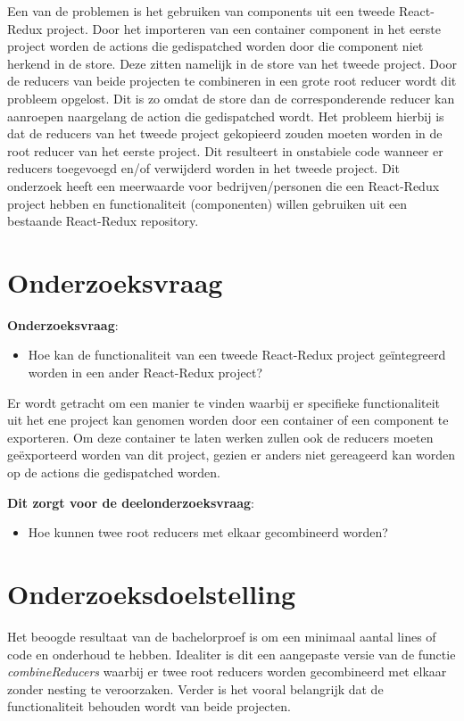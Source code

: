 Een van de problemen is het gebruiken van components uit een tweede React-Redux project. Door het importeren van een container component in het eerste project worden de actions die gedispatched worden door die component niet herkend in de store. Deze zitten namelijk in de store van het tweede project. Door de reducers van beide projecten te combineren in een grote root reducer wordt dit probleem opgelost. Dit is zo omdat de store dan de corresponderende reducer kan aanroepen naargelang de action die gedispatched wordt. Het probleem hierbij is dat de reducers van het tweede project gekopieerd zouden moeten worden in de root reducer van het eerste project. Dit resulteert in onstabiele code wanneer er reducers toegevoegd en/of verwijderd worden in het tweede project. Dit onderzoek heeft een meerwaarde voor bedrijven/personen die een React-Redux project hebben en functionaliteit (componenten) willen gebruiken uit een bestaande React-Redux repository. 


\section{Onderzoeksvraag}
\label{sec:onderzoeksvraag}

\textbf{Onderzoeksvraag}:
\begin{itemize}
	\item Hoe kan de functionaliteit van een tweede React-Redux project geïntegreerd worden in een ander React-Redux project?
\end{itemize}
Er wordt getracht om een manier te vinden waarbij er specifieke functionaliteit uit het ene project kan genomen worden door een container of een component te exporteren. Om deze container te laten werken zullen ook de reducers moeten geëxporteerd worden van dit project, gezien er anders niet gereageerd kan worden op de actions die gedispatched worden. 

\textbf{Dit zorgt voor de deelonderzoeksvraag}:
\begin{itemize}
	\item Hoe kunnen twee root reducers met elkaar gecombineerd worden?
\end{itemize}

\section{Onderzoeksdoelstelling}
\label{sec:onderzoeksdoelstelling}
Het beoogde resultaat van de bachelorproef is om een minimaal aantal lines of code en onderhoud te hebben. Idealiter is dit een aangepaste versie van de functie \textit{combineReducers} waarbij er twee root reducers worden gecombineerd met elkaar zonder nesting te veroorzaken. Verder is het vooral belangrijk dat de functionaliteit behouden wordt van beide projecten.

